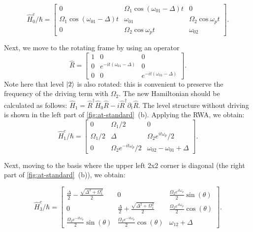 \documentclass[%
 pra,
 amsmath,amssymb,
 reprint,%
]{revtex4-1}
\begin{document}
\begin{equation*}
\hat H^c_0/\hbar = \left[\begin{matrix}
0 & \Omega_{1} \cos{\left(\omega_{01}- \Delta \right)t} & 0\\
\Omega_{1} \cos{\left(\omega_{01} - \Delta \right)t}   & \omega_{01} &\Omega_{2} \cos\omega_p t  \\
0 & \Omega_{2} \cos{\omega_p t}  & \omega_{02}\end{matrix}\right].
\end{equation*}

Next, we move to the rotating frame by using an operator
\[
\hat R = \left[\begin{matrix} 
1 & 0 & 0\\0 & e^{- i t \left(\omega_{01}- \Delta\right)} & 0\\0 & 0 & e^{- i t \left(\omega_{01}- \Delta\right)}\end{matrix}\right].
\]
Note here that level $\ket{2}$ is also rotated: this is convenient to preserve the frequency of the driving term with $\Omega_2$. The new Hamiltonian should be calculated as follows: $\hat H_1 = \hat R^\dag \hat H_0 \hat R - i \hat{R}^\dag \partial_t  \hat R$. The level structure without driving  is shown in the left part of \autoref{fig:at-standard}~(b). Applying the RWA, we obtain:
\begin{equation*}
\hat H^c_1/\hbar = \left[\begin{matrix}0 &\Omega_{1}/2 & 0\\\Omega_{1}/2 & \Delta & \Omega_{2} e^{i t \omega_p}/2\\0 & \Omega_{2} e^{-i t \omega_p}/2 & \omega_{02} - \omega_{01}+\Delta \end{matrix}\right].
\end{equation*}

Next, moving to the basis where the upper left 2x2 corner is diagonal (the right part of \autoref{fig:at-standard}~(b)), we obtain:

\begin{equation*}
\hat H^c_3/\hbar = \left[\begin{matrix} 
\frac{\Delta}{2} - \frac{\sqrt{\Delta^{2} + \Omega_{1}^{2}}}{2} & 
0 &
\frac{\Omega_{2} e^{i t \omega_{p}}}{2}\sin(\theta)
\\
0 & 
\frac{\Delta}{2} + \frac{\sqrt{\Delta^{2} + \Omega_{1}^{2}}}{2} & 
\frac{\Omega_{2} e^ {i t \omega_p}}{2}\cos(\theta)
\\
\frac{\Omega_{2} e^{-i t \omega_{p}} }{2}\sin(\theta) & 
\frac{\Omega_{2} e^{-i t \omega_{p}}}{2} \cos(\theta) & 
\omega_{12} +\Delta 
\end{matrix}\right].
\end{equation*}
\end{document}
